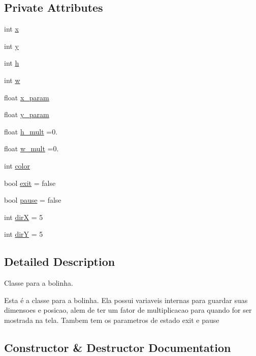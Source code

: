 \subsection*{Private Attributes}
\begin{DoxyCompactItemize}
\item 
int \hyperlink{classbolinha_ad6918f0b95a774318e4ceb7c3f9720de}{x}
\item 
int \hyperlink{classbolinha_a1ef5bc9948639dc0065e17a8e6b88846}{y}
\item 
int \hyperlink{classbolinha_a971dc9047d1dcc5fd7cf4c4ed945de45}{h}
\item 
int \hyperlink{classbolinha_a4136d7cb978a3190073e1544fb336876}{w}
\item 
float \hyperlink{classbolinha_ac9d2238772d85a88f57602ff7bfd8387}{x\+\_\+param}
\item 
float \hyperlink{classbolinha_a2fe551614672e64a4f34ecdd226de4ca}{y\+\_\+param}
\item 
float \hyperlink{classbolinha_add6888f6be8396c001dfa10e15d6a4be}{h\+\_\+mult} =0.
\item 
float \hyperlink{classbolinha_a91dd1f60f5312cf476e02e5396c2f871}{w\+\_\+mult} =0.
\item 
int \hyperlink{classbolinha_af44eba52e992cb2ed5787bce3256dca1}{color}
\item 
bool \hyperlink{classbolinha_a29132ebeca6235fa17c303151622cd3b}{exit} = false
\item 
bool \hyperlink{classbolinha_a85326b85a811e46b6d98c900e141b0ef}{pause} = false
\item 
int \hyperlink{classbolinha_a0e4ccf4bf9cd1b980323dbcba247ca8b}{dirX} = 5
\item 
int \hyperlink{classbolinha_a9ed43eedc9ce54d9645824b4a876171e}{dirY} = 5
\end{DoxyCompactItemize}


\subsection{Detailed Description}
Classe para a bolinha. 

Esta é a classe para a bolinha. Ela possui variaveis internas para guardar suas dimensoes e posicao, alem de ter um fator de multiplicacao para quando for ser mostrada na tela. Tambem tem os parametros de estado exit e pause 

\subsection{Constructor \& Destructor Documentation}
